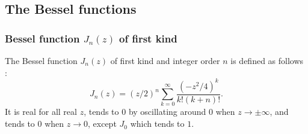 \documentclass[12pt]{amsart}
\begin{document}
\subsection{The Bessel functions}

\subsubsection{Bessel function $J_n(z)$ of first kind}

The Bessel function $J_n(z)$ of first kind and integer order $n$
is defined as follows \cite[Eq.~(9.1.10)]{AbSt73}:
\begin{equation} \label{Jn_0}
J_n(z) = (z/2)^n \sum_{k=0}^{\infty} \frac{(-z^2/4)^k}{k! (k+n)!}.
\end{equation}
It is real for all real $z$, tends to $0$ by oscillating around $0$ when
$z \rightarrow \pm\infty$, and tends to $0$ when $z \rightarrow 0$, except
$J_0$ which tends to $1$.
\end{document}
